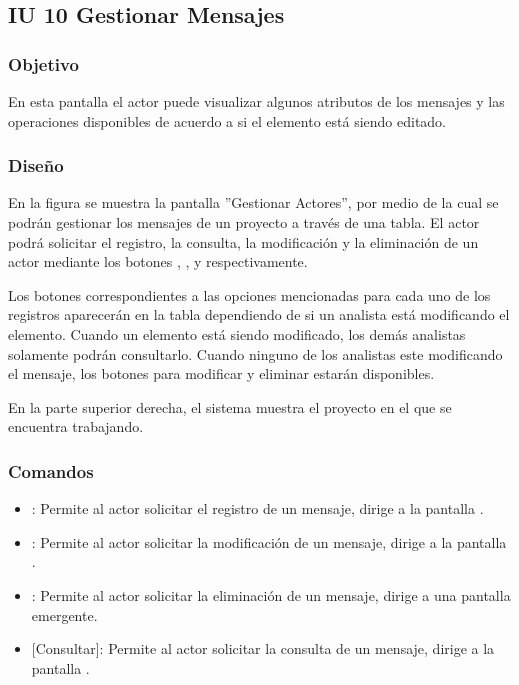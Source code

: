 \subsection{IU 10 Gestionar Mensajes}

\subsubsection{Objetivo}
	En esta pantalla el actor puede visualizar algunos atributos de los mensajes y las operaciones disponibles de acuerdo a si el elemento está siendo editado.
\subsubsection{Diseño}
	En la figura  se muestra la pantalla ''Gestionar Actores'', por medio de la cual se podrán gestionar los mensajes de un proyecto a través de una tabla. El actor podrá solicitar el registro, la consulta, la modificación y la eliminación de un actor mediante los botones , , \editar y \eliminar respectivamente.
	
	Los botones correspondientes a las opciones mencionadas para cada uno de los registros aparecerán en la tabla dependiendo de si un analista está modificando el elemento. Cuando un elemento está siendo modificado, los demás analistas solamente podrán consultarlo. Cuando ninguno de los analistas este modificando el mensaje, los botones para modificar y eliminar
	estarán disponibles.
	
	En la parte superior derecha, el sistema muestra el proyecto en el que se encuentra trabajando.

\subsubsection{Comandos}
\begin{itemize}
	\item {}: Permite al actor solicitar el registro de un mensaje, dirige a la pantalla .
	\item \editar [Modificar]: Permite al actor solicitar la modificación de un mensaje, dirige a la pantalla .
	\item \eliminar [Eliminar]: Permite al actor solicitar la eliminación de un mensaje, dirige a una pantalla emergente.
	\item {} [Consultar]: Permite al actor solicitar la consulta de un mensaje, dirige a la pantalla  .
\end{itemize}
